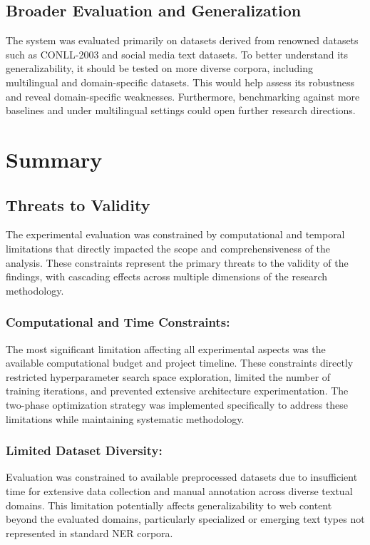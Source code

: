 \documentclass[a4paper]{usiinfbachelorproject}
\begin{document}
\subsection{Broader Evaluation and Generalization}

The system was evaluated primarily on datasets derived from renowned datasets such as CONLL-2003 and social media text datasets. To better understand its generalizability, it should be tested on more diverse corpora, including multilingual and domain-specific datasets. This would help assess its robustness and reveal domain-specific weaknesses. Furthermore, benchmarking against more baselines and under multilingual settings could open further research directions.


\section{\textbf{Summary}}
\subsection{Threats to Validity}

The experimental evaluation was constrained by computational and temporal limitations that directly impacted the scope and comprehensiveness of the analysis. These constraints represent the primary threats to the validity of the findings, with cascading effects across multiple dimensions of the research methodology.

\subsubsection{\textbf{Computational and Time Constraints:}} The most significant limitation affecting all experimental aspects was the available computational budget and project timeline. These constraints directly restricted hyperparameter search space exploration, limited the number of training iterations, and prevented extensive architecture experimentation. The two-phase optimization strategy was implemented specifically to address these limitations while maintaining systematic methodology.

\subsubsection{\textbf{Limited Dataset Diversity:}} Evaluation was constrained to available preprocessed datasets due to insufficient time for extensive data collection and manual annotation across diverse textual domains. This limitation potentially affects generalizability to web content beyond the evaluated domains, particularly specialized or emerging text types not represented in standard NER corpora.
\end{document}
